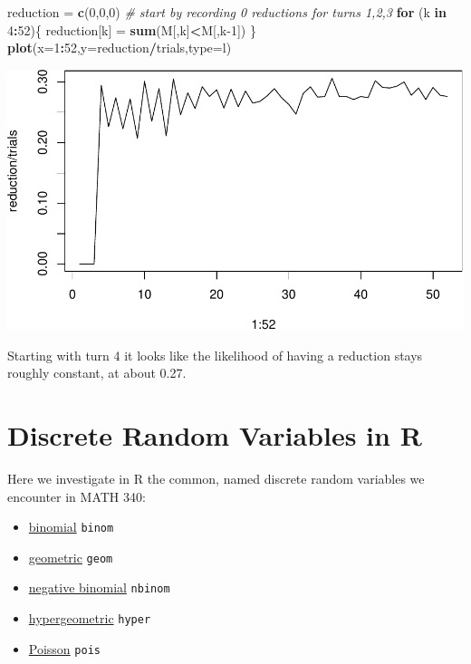 \documentclass[
]{book}
\newenvironment{Shaded}{\begin{snugshade}}{\end{snugshade}}
\newcommand{\AttributeTok}[1]{\textcolor[rgb]{0.13,0.29,0.53}{#1}}
\newcommand{\CommentTok}[1]{\textcolor[rgb]{0.56,0.35,0.01}{\textit{#1}}}
\newcommand{\ControlFlowTok}[1]{\textcolor[rgb]{0.13,0.29,0.53}{\textbf{#1}}}
\newcommand{\DecValTok}[1]{\textcolor[rgb]{0.00,0.00,0.81}{#1}}
\newcommand{\FunctionTok}[1]{\textcolor[rgb]{0.13,0.29,0.53}{\textbf{#1}}}
\newcommand{\NormalTok}[1]{#1}
\newcommand{\OtherTok}[1]{\textcolor[rgb]{0.56,0.35,0.01}{#1}}
\newcommand{\SpecialCharTok}[1]{\textcolor[rgb]{0.81,0.36,0.00}{\textbf{#1}}}
\newcommand{\StringTok}[1]{\textcolor[rgb]{0.31,0.60,0.02}{#1}}
\providecommand{\tightlist}{%
  \setlength{\itemsep}{0pt}\setlength{\parskip}{0pt}}
\theoremstyle{definition}
\theoremstyle{definition}
\theoremstyle{definition}
\theoremstyle{definition}
\theoremstyle{remark}
\begin{document}
\begin{Shaded}
\begin{Highlighting}[]
\NormalTok{reduction }\OtherTok{=} \FunctionTok{c}\NormalTok{(}\DecValTok{0}\NormalTok{,}\DecValTok{0}\NormalTok{,}\DecValTok{0}\NormalTok{) }\CommentTok{\# start by recording 0 reductions for turns 1,2,3}
\ControlFlowTok{for}\NormalTok{ (k }\ControlFlowTok{in} \DecValTok{4}\SpecialCharTok{:}\DecValTok{52}\NormalTok{)\{}
\NormalTok{  reduction[k] }\OtherTok{=} \FunctionTok{sum}\NormalTok{(M[,k]}\SpecialCharTok{\textless{}}\NormalTok{M[,k}\DecValTok{{-}1}\NormalTok{])}
\NormalTok{\}}
\FunctionTok{plot}\NormalTok{(}\AttributeTok{x=}\DecValTok{1}\SpecialCharTok{:}\DecValTok{52}\NormalTok{,}\AttributeTok{y=}\NormalTok{reduction}\SpecialCharTok{/}\NormalTok{trials,}\AttributeTok{type=}\StringTok{\textquotesingle{}l\textquotesingle{}}\NormalTok{)}
\end{Highlighting}
\end{Shaded}

\includegraphics{math340-notes_files/figure-latex/unnamed-chunk-154-1.pdf}

Starting with turn 4 it looks like the likelihood of having a reduction stays roughly constant, at about 0.27.

\chapter{Discrete Random Variables in R}\label{R-discreteRV}

Here we investigate in R the common, named discrete random variables we encounter in MATH 340:

\begin{itemize}
\tightlist
\item
  \hyperref[binomialR]{binomial} \textbar{} \texttt{binom}
\item
  \hyperref[geometricR]{geometric} \textbar{} \texttt{geom}
\item
  \hyperref[negbinomR]{negative binomial} \textbar{} \texttt{nbinom}
\item
  \hyperref[hyperR]{hypergeometric} \textbar{} \texttt{hyper}
\item
  \hyperref[poissonR]{Poisson} \textbar{} \texttt{pois}
\end{itemize}
\end{document}
